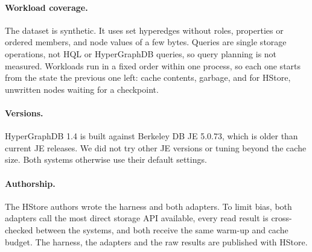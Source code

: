 \paragraph{Workload coverage.} The dataset is synthetic. It uses set hyperedges without roles, properties or ordered members, and node values of a few bytes. Queries are single storage operations, not HQL or HyperGraphDB queries, so query planning is not measured. Workloads run in a fixed order within one process, so each one starts from the state the previous one left: cache contents, garbage, and for HStore, unwritten nodes waiting for a checkpoint.

\paragraph{Versions.} HyperGraphDB 1.4 is built against Berkeley DB JE 5.0.73, which is older than current JE releases. We did not try other JE versions or tuning beyond the cache size. Both systems otherwise use their default settings.

\paragraph{Authorship.} The HStore authors wrote the harness and both adapters. To limit bias, both adapters call the most direct storage API available, every read result is cross-checked between the systems, and both receive the same warm-up and cache budget. The harness, the adapters and the raw results are published with HStore.

